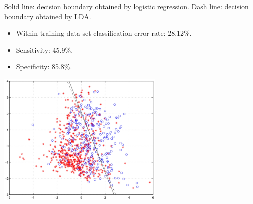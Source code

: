 \documentclass[12pt,notes,mathserif]{beamer}
\begin{document}
\begin{frame}[c]
	\frametitle{}
	Solid line: decision boundary obtained by logistic regression. Dash line: decision boundary obtained by LDA.

	\begin{itemize}
		\item
		      Within training data set classification error rate: 28.12\%.
		\item Sensitivity: 45.9\%.
		\item Specificity: 85.8\%.
	\end{itemize}
	\begin{center}
		\includegraphics[width=0.6\textwidth]{lec12-26.jpg}
	\end{center}
\end{frame}
\end{document}
